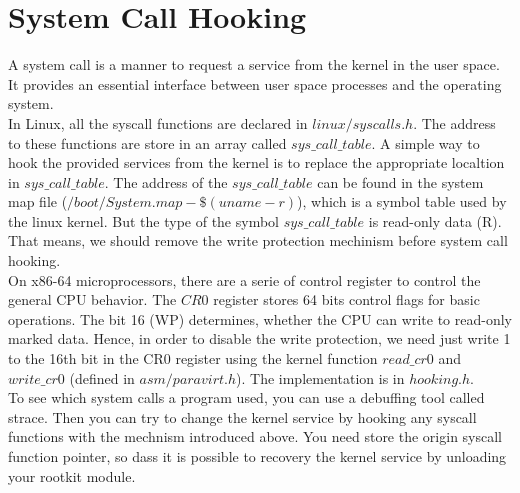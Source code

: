 \section{System Call Hooking}
\label{sec:syscallHooking}
A system call is a manner to request a service from the kernel in the user space. It provides an essential interface between user space processes and the operating system.\\
In Linux, all the syscall functions are declared in $linux/syscalls.h$. The address to these functions are store in an array called $sys\_call\_table$. 
A simple way to hook the provided services from the kernel is to replace the appropriate localtion in $sys\_call\_table$. The address of the $sys\_call\_table$ can be found in the system map file ($/boot/System.map-\$(uname -r)$), which is a symbol table used by the linux kernel. But the type of the symbol $sys\_call\_table$ is read-only data (R). That means, we should remove the write protection mechinism before system call hooking.\\
On x86-64 microprocessors, there are a serie of control register to control the general CPU behavior. The $CR0$ register stores 64 bits control flags for basic operations. The bit 16 (WP) determines, whether the CPU can write to read-only marked data. Hence, in order to disable the write protection, we need just write 1 to the 16th bit in the CR0 register using the kernel function $read\_cr0$ and $write\_cr0$ (defined in $asm/paravirt.h$). The implementation is in $hooking.h$.\\
To see which system calls a program used, you can use a debuffing tool called strace. Then you can try to change the kernel service by hooking any syscall functions with the mechnism introduced above. You need store the origin syscall function pointer, so dass it is possible to recovery the kernel service by unloading your rootkit module. 

